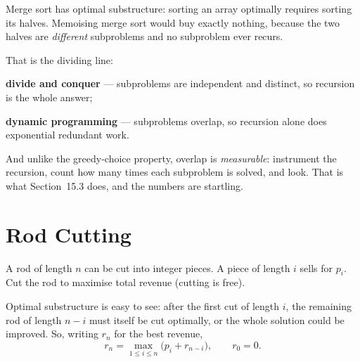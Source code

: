 \begin{conceptbox}
Merge sort has optimal substructure: sorting an array optimally requires
sorting its halves. Memoising merge sort would buy exactly nothing, because
the two halves are \emph{different} subproblems and no subproblem ever recurs.

\smallskip
That is the dividing line:

\begin{tight}
  \item \textbf{divide and conquer} --- subproblems are independent and
        distinct, so recursion is the whole answer;
  \item \textbf{dynamic programming} --- subproblems overlap, so recursion
        alone does exponential redundant work.
\end{tight}

\smallskip
And unlike the greedy-choice property, overlap is \emph{measurable}: instrument
the recursion, count how many times each subproblem is solved, and look. That
is what Section~15.3 does, and the numbers are startling.
\end{conceptbox}

\section{Rod Cutting}

\begin{definitionbox}
A rod of length $n$ can be cut into integer pieces. A piece of length $i$ sells
for $p_{i}$. Cut the rod to maximise total revenue (cutting is free).
\end{definitionbox}

Optimal substructure is easy to see: after the first cut of length $i$, the
remaining rod of length $n-i$ must itself be cut optimally, or the whole
solution could be improved. So, writing $r_{n}$ for the best revenue,
\[ r_{n} = \max_{1 \le i \le n} \bigl(p_{i} + r_{n-i}\bigr), \qquad r_{0} = 0. \]


